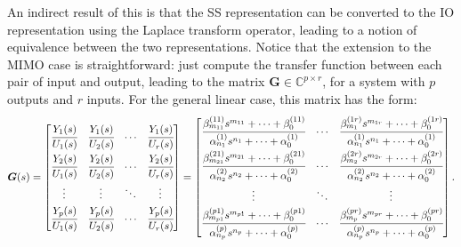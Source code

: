 \documentclass[a4paper,11pt]{book}
\numberwithin{figure}{chapter}
\numberwithin{equation}{chapter}
\numberwithin{table}{chapter}
\theoremstyle{definition}
\begin{document}
An indirect result of this is that the SS representation can be converted to the IO representation using the Laplace transform operator, leading to a notion of equivalence between the two representations. Notice that the extension to the MIMO case is straightforward: just compute the transfer function between each pair of input and output, leading to the matrix $\bm{G} \in \mathbb{C}^{p \times r}$, for a system with $p$ outputs and $r$ inputs. For the general linear case, this matrix has the form:
\begin{align}
\bm{G}(s) = 
\begin{bmatrix}
	\cfrac{Y_1(s)}{U_1(s)} & \cfrac{Y_1(s)}{U_2(s)} & \cdots & \cfrac{Y_1(s)}{U_r(s)} \vspace{0.7ex} \\
	\cfrac{Y_2(s)}{U_1(s)} & \cfrac{Y_2(s)}{U_2(s)} & \cdots & \cfrac{Y_2(s)}{U_r(s)} \vspace{0.7ex} \\
	\vdots & \vdots & \ddots & \vdots \vspace{0.7ex} \\
	\cfrac{Y_p(s)}{U_1(s)} & \cfrac{Y_p(s)}{U_2(s)} & \cdots & \cfrac{Y_p(s)}{U_r(s)}
\end{bmatrix} =
\begin{bmatrix}
	\cfrac{\beta_{m_{11}}^{(11)} s^{m_{11}} + \cdots + \beta^{(11)}_{0}}{\alpha^{(1)}_{n_1} s^{n_1} + \cdots + \alpha^{(1)}_0} & \cdots & \cfrac{\beta_{m_1}^{(1r)} s^{m_{1r}} + \cdots + \beta^{(1r)}_0}{\alpha^{(1)}_{n_1} s^{n_1} + \cdots + \alpha^{(1)}_0} \vspace{0.7ex} \\
	\cfrac{\beta_{m_{21}}^{(21)} s^{m_{21}} + \cdots + \beta^{(21)}_{0}}{\alpha^{(2)}_{n_2} s^{n_2} + \cdots + \alpha^{(2)}_0} & \cdots & \cfrac{\beta_{m_2}^{(2r)} s^{m_{2r}} + \cdots + \beta^{(2r)}_0}{\alpha^{(2)}_{n_2} s^{n_2} + \cdots + \alpha^{(2)}_0} \vspace{0.7ex} \\
	\vdots & \ddots & \vdots \vspace{0.7ex} \\
	\cfrac{\beta_{m_{p1}}^{(p1)} s^{m_{p1}} + \cdots + \beta^{(p1)}_{0}}{\alpha^{(p)}_{n_p} s^{n_p} + \cdots + \alpha^{(p)}_0} & \cdots & \cfrac{\beta_{m_p}^{(pr)} s^{m_{pr}} + \cdots + \beta^{(pr)}_0}{\alpha^{(p)}_{n_p} s^{n_p} + \cdots + \alpha^{(p)}_0} 
\end{bmatrix}
.\end{align}
\end{document}
